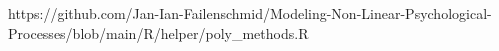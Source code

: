 https://github.com/Jan-Ian-Failenschmid/Modeling-Non-Linear-Psychological-Processes/blob/main/R/helper/poly_methods.R
